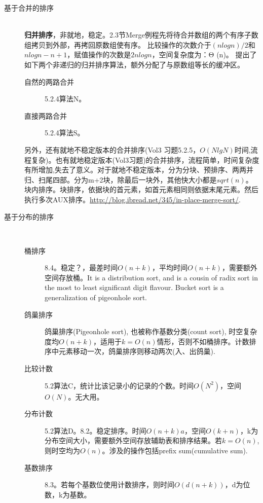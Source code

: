 \begin{description}
\begin{description}
	\end{description}
    \item[基于合并的排序] 
        \hfill \\
	\textbf{归并排序}，非就地，稳定。\cite{ita}2.3节Merge例程先将待合并数组的两个有序子数组拷贝到外部，再拷回原数组使有序。
	比较操作的次数介于$(nlogn)/2$和$nlogn-n+1$，赋值操作的次数是$2nlogn$，空间复杂度为：Θ (n)\cite{weijipedia}。
	\cite{acp}提出了如下两个非递归的归并排序算法，额外分配了与原数组等长的缓冲区。
	\begin{description}
	    \item[自然的两路合并]\cite{acp}5.2.4算法N。
	    \item[直接两路合并]\cite{acp}5.2.4算法S。
	\end{description}
	另外，还有就地不稳定版本的合并排序(\cite{acp}Vol3 习题5.2.5，$O(NlgN)$时间,流程复杂)。也有就地稳定版本(\cite{acp}Vol3习题)的合并排序，流程简单，时间复杂度有所增加,失去了意义。对于就地不稳定版本，分为分块、预排序、两两并归、扫尾四部。分为m+2块，除最后一块外，其他快大小都是$sqrt(n)$。块内排序。块排序，依据块的首元素，如首元素相同则依据末尾元素。然后执行多次AUX排序。\url{http://blog.ibread.net/345/in-place-merge-sort/}.
    \item[基于分布的排序] \hfill \\

	\begin{description}
	    \item[桶排序]\cite{ita}8.4。稳定？，最差时间$O(n+k)$，平均时间$O(n+k)$，需要额外空间存放桶。It is a distribution sort, and is a cousin of radix sort in the most to least significant digit flavour. Bucket sort is a generalization of pigeonhole sort. 
	    \item[鸽巢排序]鸽巢排序(Pigeonhole sort), 也被称作基数分类\cite{weijipedia}(count sort\cite{wikipedia}), 时空复杂度均$O(n+k)$，适用于$k=O(n)$情形，否则不如桶排序。计数排序中元素移动一次，鸽巢排序则移动两次(入、出鸽巢)\cite{wikipedia}.
	    \item[比较计数]\cite{acp}5.2算法C，统计比该记录小的记录的个数。时间$O(N^2)$，空间$O(N)$。无大用。
	    \item[分布计数]\cite{acp}5.2算法D。\cite{ita}8.2。稳定排序。时间$O(n+k)a$，空间$O(k+n)$，k为分布空间大小，需要额外空间存放辅助表和排序结果。若$k=O(n)$,则时空均为$O(n)$。涉及的操作包括prefix sum(cumulative sum).
	    \item[基数排序]\cite{ita}8.3。若每个基数位使用计数排序，则时间$O(d(n+k))$，d为位数，k为基数。
	\end{description}
\end{description}

